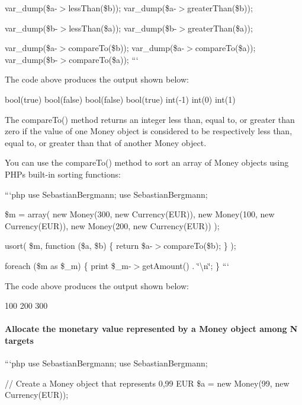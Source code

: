 var\+\_\+dump(\$a-\/$>$less\+Than(\$b)); var\+\_\+dump(\$a-\/$>$greater\+Than(\$b));

var\+\_\+dump(\$b-\/$>$less\+Than(\$a)); var\+\_\+dump(\$b-\/$>$greater\+Than(\$a));

var\+\_\+dump(\$a-\/$>$compare\+To(\$b)); var\+\_\+dump(\$a-\/$>$compare\+To(\$a)); var\+\_\+dump(\$b-\/$>$compare\+To(\$a)); ```

The code above produces the output shown below\+: \begin{DoxyVerb}bool(true)
bool(false)
bool(false)
bool(true)
int(-1)
int(0)
int(1)
\end{DoxyVerb}


The {\ttfamily compare\+To()} method returns an integer less than, equal to, or greater than zero if the value of one {\ttfamily Money} object is considered to be respectively less than, equal to, or greater than that of another {\ttfamily Money} object.

You can use the {\ttfamily compare\+To()} method to sort an array of {\ttfamily Money} objects using P\+H\+P\textquotesingle{}s built-\/in sorting functions\+:

```php use Sebastian\+Bergmann; use Sebastian\+Bergmann;

\$m = array( new Money(300, new Currency(\textquotesingle{}E\+U\+R\textquotesingle{})), new Money(100, new Currency(\textquotesingle{}E\+U\+R\textquotesingle{})), new Money(200, new Currency(\textquotesingle{}E\+U\+R\textquotesingle{})) );

usort( \$m, function (\$a, \$b) \{ return \$a-\/$>$compare\+To(\$b); \} );

foreach (\$m as \$\+\_\+m) \{ print \$\+\_\+m-\/$>$get\+Amount() . \char`\"{}\textbackslash{}n\char`\"{}; \} ```

The code above produces the output shown below\+: \begin{DoxyVerb}100
200
300
\end{DoxyVerb}


\paragraph*{Allocate the monetary value represented by a Money object among N targets}

```php use Sebastian\+Bergmann; use Sebastian\+Bergmann;

// Create a Money object that represents 0,99 E\+U\+R \$a = new Money(99, new Currency(\textquotesingle{}E\+U\+R\textquotesingle{}));

